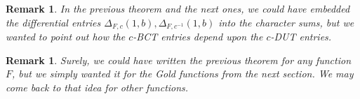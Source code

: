 \documentclass[11pt]{article}
\newtheorem{remark}{Remark}
\newtheorem{rem}[thm]{Remark}
\def\cN{{\mathcal N}}
\def\F{{\mathbb F}}
\def\\{\cr}
\begin{document}

\begin{remark}
In the previous theorem and the next ones, we could have embedded the differential entries $\Delta_{F,c}(1,b),\Delta_{F,c^{-1}}(1,b)$ into the character sums, but we wanted to point out how the $c$-BCT entries depend upon the $c$-DUT entries.
\end{remark}
 \begin{rem}
 Surely, we could have written the previous theorem for any function $F$, but we simply wanted it for the Gold functions from the next section. We may come back to that idea for other functions.
 \end{rem}
\end{document}
